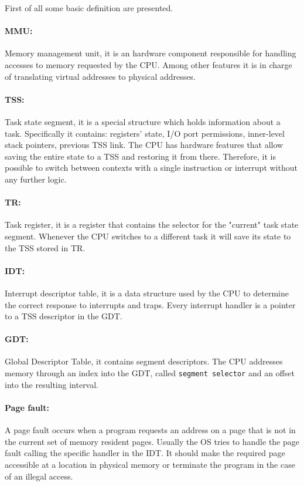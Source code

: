 \documentclass[11pt,twoside,a4paper]{article}
\begin{document}
First of all some basic definition are presented.

\paragraph{MMU: } Memory management unit, it is an hardware component responsible for handling accesses to memory requested by the CPU. Among other features it is in charge of translating virtual addresses to physical addresses.

\paragraph{TSS: } Task state segment, it is a special structure which holds information about a task. Specifically it contains: registers' state, I/O port permissions, inner-level stack pointers, previous TSS link. The CPU has hardware features that allow saving the entire state to a TSS and restoring it from there. Therefore, it is possible to switch between contexts with a single instruction or interrupt without any further logic.

\paragraph{TR: } Task register, it is a register that contains the selector for the "current" task state segment. Whenever the CPU switches to a different task it will save its state to the TSS stored in TR.

\paragraph{IDT: } Interrupt descriptor table, it is a data structure used by the CPU to determine the correct response to interrupts and traps. Every interrupt handler is a pointer to a TSS descriptor in the GDT.

\paragraph{GDT: } Global Descriptor Table, it contains segment descriptors. The CPU addresses memory through an index into the GDT, called \texttt{segment selector} and an offset into the resulting interval.

\paragraph{Page fault: } A page fault occurs when a program requests an address on a page that is not in the current set of memory resident pages. Usually the OS tries to handle the page fault calling the specific handler in the IDT. It should make the required page accessible at a location in physical memory or terminate the program in the case of an illegal access.
\end{document}
